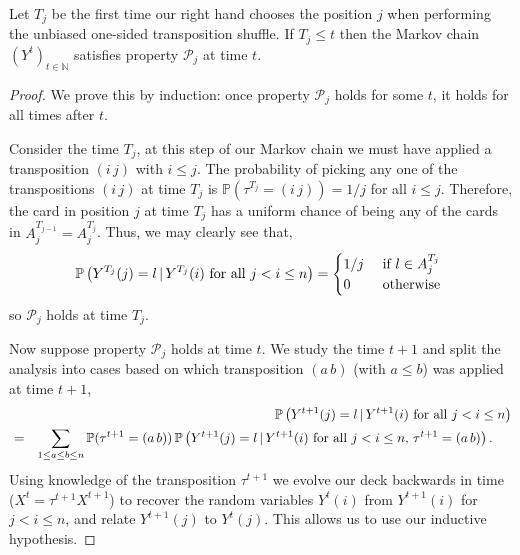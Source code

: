 \documentclass[11pt]{report}
\begin{document}
\begin{lemma}
	\label{lem:SUTpropj}
	Let $T_{j}$ be the first time our right hand chooses the position
	$j$ when performing the unbiased one-sided transposition shuffle. 
	If $T_{j} \leq t$ then the Markov chain $(Y^{t})_{t\in \mathbb{N}}$ satisfies property $\mathcal{P}_{j}$ at time $t$.
\end{lemma}
\begin{proof}
	We prove this by induction: once property $\mathcal{P}_{j}$ holds for some $t$, it holds for all times after $t$. 
	
	
	Consider the time $T_{j}$, at this step of our Markov chain we must have applied  a transposition 
	$(i\,j)$ with $i\leq j$. The probability of picking any one of the transpositions $(i \,j)$ at time $T_{j}$ is $\mathbb{P}(\tau^{T_{j}} = (i\,j)) = 1/j$ for all $i\leq j$. Therefore, the card in position $j$ at time $T_{j}$ has a uniform chance of being any of the cards in $A_{j}^{T_{j-1}} = A_{j}^{T_{j}}$. Thus, we may clearly see that,
	\begin{eqnarray}
	\mathbb{P}\left(Y^{T_{j}} (j) = l \, | \, Y^{T_{j}}(i) \textnormal{ for all } j < i \leq n \right)= 
	\begin{cases}
	1/j & \textnormal{ if } l \in A_{j}^{T_{j}}\\
	0 & \textnormal{ otherwise } 
	\end{cases}
	\end{eqnarray} 
	so $\mathcal{P}_{j}$ holds at time $T_{j}$.
	
	
	Now suppose property $\mathcal{P}_{j}$ holds at time $t$. We study the time $t+1$ and split the analysis 
	into cases based on which transposition $(a \,b)$ (with $a\leq b$) was applied at time 
	$t+1$,
	\begin{eqnarray}
	& & \mathbb{P}\left(Y^{t+1}(j) =  l \, | \, Y^{t+1}(i) \textnormal{ for all } j < i \leq n\right) \nonumber\\
	& = &
	\sum_{\substack{1\leq a \leq b \leq n}} \mathbb{P}(\tau^{t+1} = 
	(a\,b)) \, \mathbb{P}\left(Y^{t+1} (j) 
	= l \, | \, Y^{t+1}(i) \textnormal{ for all } j < i \leq n, \, \tau^{t+1} = (a\,b) 
	\right).\hspace{0.5cm}\label{eqn:SSTinduction} 
	\end{eqnarray}
	Using knowledge of the transposition $\tau^{t+1}$ we evolve our deck backwards in time ($X^{t} = \tau^{t+1} X^{t+1}$) to recover the random variables $Y^{t}(i)$ from $Y^{t+1}(i)$ for $j < i \leq n$, and relate $Y^{t+1}(j)$ to $Y^{t}(j)$. This allows us to use our inductive hypothesis.
	

\end{proof}
\end{document}
